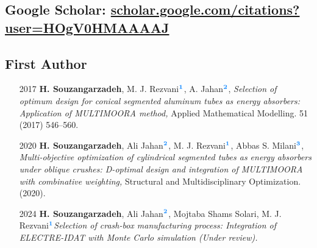 \documentclass[
	a4paper,
]{ThirtyNinesecondscv}
\begin{document}
\subsection{Google Scholar: {\small\href{https://scholar.google.com/citations?user=HOgV0HMAAAAJ}{\textcolor[rgb]{0.00,0.00,0.55}{{\selectfont
				scholar.google.com/citations?user=HOgV0HMAAAAJ}}}}}
\subsection{First Author}
\begin{itemize}
\item[2017] \textbf{H. Souzangarzadeh}, M. J. Rezvani$ ^{\textcolor[rgb]{0.00,0.50,1.00}{\textbf{1}}} $, A. Jahan$ ^{\textcolor[rgb]{0.00,0.50,1.00}{\textbf{2}}} $, \textit{Selection of optimum design for conical segmented aluminum tubes as energy absorbers: Application of MULTIMOORA method,} Applied Mathematical Modelling. 51 (2017) 546–560. \\	
 \hfill {}
 		 
   
 	
  
\item[2020] \textbf{H. Souzangarzadeh}, Ali Jahan$ ^{\textcolor[rgb]{0.00,0.50,1.00}{\textbf{2}}} $, M. J. Rezvani$ ^{\textcolor[rgb]{0.00,0.50,1.00}{\textbf{1}}} $,  Abbas S. Milani$ ^{\textcolor[rgb]{0.00,0.50,1.00}{\textbf{3}}} $, \textit{Multi-objective optimization of cylindrical segmented tubes as energy absorbers under oblique crushes: D-optimal design and integration of MULTIMOORA with combinative weighting,} Structural and Multidisciplinary Optimization. (2020). \\ 
 \hfill {}
	 	
	\item[2024] \textbf{H. Souzangarzadeh}, Ali Jahan$ ^{\textcolor[rgb]{0.00,0.50,1.00}{\textbf{2}}}$, Mojtaba Shams Solari,  M. J. Rezvani$ ^{\textcolor[rgb]{0.00,0.50,1.00}{\textbf{1}}} $\textit{Selection of crash-box manufacturing process: Integration of ELECTRE-IDAT with Monte Carlo simulation (Under review).} 	\\ 
\end{itemize}
\end{document}
